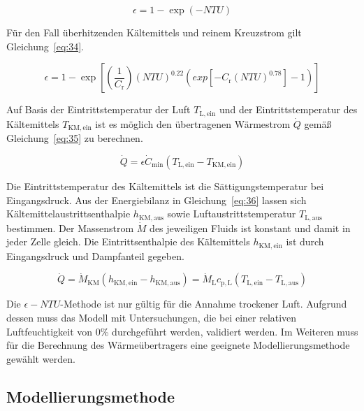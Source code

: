 \begin{equation}
\label{eq:33}
\epsilon = 1- \exp{(-NTU)}
\end{equation}

Für den Fall überhitzenden Kältemittels und reinem Kreuzstrom gilt Gleichung~\ref{eq:34}.

\begin{equation}
\label{eq:34}
\epsilon = 1- \exp{\left[\left(\frac{1}{C_\mathrm{r}}\right)(NTU)^{0.22}(exp{[-C_\mathrm{r}(NTU)^{0.78}]}-1)\right]}
\end{equation}


Auf Basis der Eintrittstemperatur der Luft $T_{\mathrm{L,ein}}$ und der Eintrittstemperatur des Kältemittels $T_{\mathrm{KM,ein}}$ ist es möglich den übertragenen Wärmestrom $\dot{Q}$ gemäß Gleichung~\ref{eq:35} zu berechnen. 

\begin{equation}
\label{eq:35}
\dot{Q} = \epsilon \dot{C}_{\mathrm{min}} (T_{\mathrm{L,ein}} - T_{\mathrm{KM,ein}})
\end{equation}

Die Eintrittstemperatur des Kältemittels ist die Sättigungstemperatur bei Eingangsdruck. Aus der Energiebilanz in Gleichung~\ref{eq:36} lassen sich Kältemittelaustrittsenthalpie $h_{\mathrm{KM,aus}}$ sowie Luftaustrittstemperatur $T_{\mathrm{L,aus}}$ bestimmen. Der Massenstrom $\dot{M}$ des jeweiligen Fluids ist konstant und damit in jeder Zelle gleich. Die Eintrittsenthalpie des Kältemittels $h_{\mathrm{KM,ein}}$ ist durch Eingangsdruck und Dampfanteil gegeben.

\begin{equation}
\label{eq:36}
\dot{Q} = \dot{M}_{\mathrm{KM}} (h_{\mathrm{KM,ein}} - h_{\mathrm{KM,aus}}) = \dot{M}_{\mathrm{L}} c_{\mathrm{p,L}}(T_{\mathrm{L,ein}} - T_{\mathrm{L,aus}})
\end{equation}

Die $\epsilon-NTU$-Methode ist nur gültig für die Annahme trockener Luft. Aufgrund dessen muss das Modell mit Untersuchungen, die bei einer relativen Luftfeuchtigkeit von \unit{0}{\%} durchgeführt werden, validiert werden. Im Weiteren muss für die Berechnung des Wärmeübertragers eine geeignete Modellierungsmethode gewählt werden.


\subsection{Modellierungsmethode}
\label{subsec:Das Modell}

